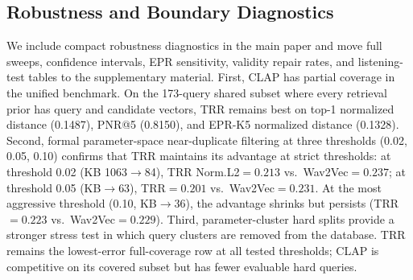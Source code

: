 \subsection{Robustness and Boundary Diagnostics}
\label{ssec:diagnostics}

We include compact robustness diagnostics in the main paper and move full sweeps, confidence intervals, EPR sensitivity, validity repair rates, and listening-test tables to the supplementary material. First, CLAP has partial coverage in the unified benchmark. On the 173-query shared subset where every retrieval prior has query and candidate vectors, TRR remains best on top-1 normalized distance (0.1487), PNR@5 (0.8150), and EPR-K5 normalized distance (0.1328). Second, formal parameter-space near-duplicate filtering at three thresholds (0.02, 0.05, 0.10) confirms that TRR maintains its advantage at strict thresholds: at threshold 0.02 (KB 1063$\rightarrow$84), TRR Norm.L2$=0.213$ vs.\ Wav2Vec$=0.237$; at threshold 0.05 (KB$\rightarrow$63), TRR$=0.201$ vs.\ Wav2Vec$=0.231$. At the most aggressive threshold (0.10, KB$\rightarrow$36), the advantage shrinks but persists (TRR$=0.223$ vs.\ Wav2Vec$=0.229$). Third, parameter-cluster hard splits provide a stronger stress test in which query clusters are removed from the database. TRR remains the lowest-error full-coverage row at all tested thresholds; CLAP is competitive on its covered subset but has fewer evaluable hard queries.

\begin{table}[t]
\centering
\caption{Compact robustness diagnostics. Near-duplicate rows report TRR normalized L2 after removing candidates within the threshold of any query. Hard-split rows report the best full-coverage TRR normalized L2 under parameter-cluster exclusion. Full baseline sweeps and confidence intervals are provided in the supplementary material.}
\label{tab:robustness_summary}
\small
\setlength{\tabcolsep}{4pt}
\end{table}

